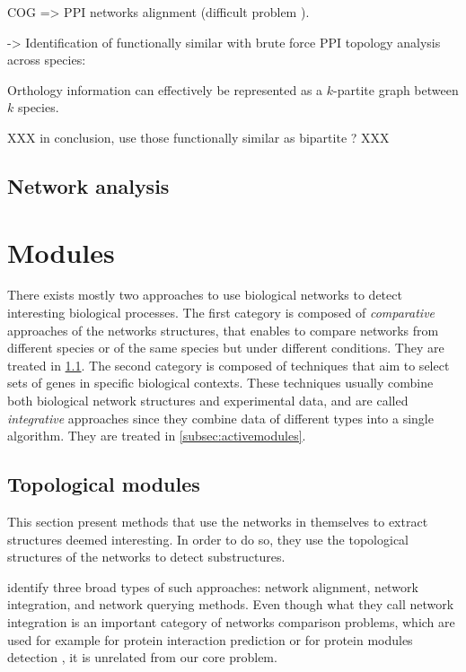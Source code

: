 	COG => PPI networks alignment (difficult problem \parencite{el2011lagrangian}).

	-> Identification of functionally similar with brute force PPI topology analysis across species: \parencite{bandyopadhyay2006systematic}


	Orthology information can effectively be represented as a $k$-partite graph between $k$ species.

	XXX in conclusion, use those functionally similar as bipartite ? XXX

	\subsection{Network analysis}

\section{Modules}

There exists mostly two approaches to use biological networks to detect interesting biological processes.
The first category is composed of \emph{comparative} approaches of the networks structures, that enables to compare networks from different species or of the same species but under different conditions.
They are treated in \cref{subsec:topomodules}.
The second category is composed of techniques that aim to select sets of genes in specific biological contexts.
These techniques usually combine both biological network structures and experimental data, and are called \emph{integrative} approaches since they combine data of different types into a single algorithm.
They are treated in \cref{subsec:activemodules}.

\subsection{Topological modules}
\label{subsec:topomodules}

	This section present methods that use the networks in themselves to extract structures deemed interesting.
	In order to do so, they use the topological structures of the networks to detect substructures.%

	\Textcite{sharan2006modeling} identify three broad types of such approaches: network alignment, network integration, and network querying methods.
	Even though what they call network integration is an important category of networks comparison problems, which are used for example for protein interaction prediction \parencite{rhodes2005probabilistic} or for protein modules detection \parencites{kelley2005systematic}{zhang2005biology}, it is unrelated from our core problem.

